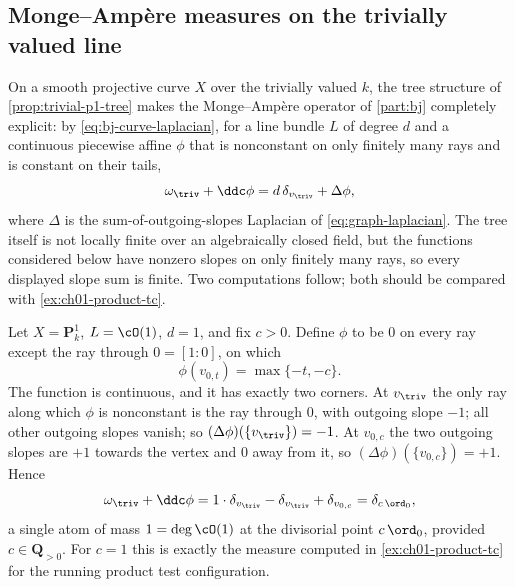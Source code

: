 \subsection{Monge--Amp\`ere measures on the trivially valued line}
\label{sec:ch08-trivial-ma}

On a smooth projective curve $X$ over the trivially valued $k$, the
tree structure of \cref{prop:trivial-p1-tree} makes the Monge--Amp\`ere
operator of \cref{part:bj} completely explicit: by
\eqref{eq:bj-curve-laplacian}, for a line bundle $L$ of degree $d$ and a
continuous piecewise affine $\phi$ that is nonconstant on only finitely many
rays and is constant on their tails,
\begin{equation}
\label{eq:ch08-trivial-curve-ma}
 \omega_\triv+\ddc\phi=d\,\delta_{v_\triv}+\Delta\phi ,
\end{equation}
where $\Delta$ is the sum-of-outgoing-slopes Laplacian of
\eqref{eq:graph-laplacian}.  The tree itself is not locally finite over an
algebraically closed field, but the functions considered below have nonzero
slopes on only finitely many rays, so every displayed slope sum is finite.
Two computations follow; both should be
compared with \cref{ex:ch01-product-tc}.

\begin{example}
\label{ex:ch08-trivial-one-ray}
Let $X=\mathbf P^1_k$, $L=\cO(1)$, $d=1$, and fix $c>0$.  Define $\phi$ to be
$0$ on every ray except the ray through $0=[1:0]$, on which
\[
 \phi(v_{0,t})=\max\{-t,-c\} .
\]
The function is continuous, and it has exactly two corners.  At $v_\triv$
the only ray along which $\phi$ is nonconstant is the ray through $0$, with
outgoing slope $-1$; all other outgoing slopes vanish; so
$(\Delta\phi)(\{v_\triv\})=-1$.  At $v_{0,c}$ the two outgoing slopes are
$+1$ towards the vertex and $0$ away from it, so
$(\Delta\phi)(\{v_{0,c}\})=+1$.  Hence
\[
 \omega_\triv+\ddc\phi
 =1\cdot\delta_{v_\triv}-\delta_{v_\triv}+\delta_{v_{0,c}}
 =\delta_{c\,\ord_0} ,
\]
a single atom of mass $1=\deg\cO(1)$ at the divisorial point $c\,\ord_0$,
provided $c\in\mathbf Q_{>0}$.  For $c=1$ this is exactly the measure
computed in \cref{ex:ch01-product-tc} for the running product test
configuration.
\end{example}


